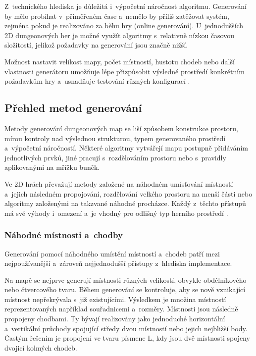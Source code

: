 \documentclass[
   program=itk,
   biblatex,
   figures=true,
   tables=true,
   glossaries,
   index
]{kidiplom}
\begin{document}
Z~technického hlediska je důležitá i~výpočetní náročnost algoritmu. Generování by mělo probíhat v~přiměřeném čase a~nemělo by příliš zatěžovat systém, zejména pokud je realizováno za běhu hry (online generování). U~jednodušších 2D dungeonových her je možné využít algoritmy s~relativně nízkou časovou složitostí, jelikož požadavky na generování jsou značně nižší.

Možnost nastavit velikost mapy, počet místností, hustotu chodeb nebo další vlastnosti generátoru umožňuje lépe přizpůsobit výsledné prostředí konkrétním požadavkům hry a~usnadňuje testování různých konfigurací \cite{Linden2014,Shaker2016}.

\subsection{Přehled metod generování}
\label{sec:prehledMetod}
Metody generování dungeonových map se liší způsobem konstrukce prostoru, mírou kontroly nad výslednou strukturou, typem generovaného prostředí a~výpočetní náročností. Některé algoritmy vytvářejí mapu postupně přidáváním jednotlivých prvků, jiné pracují s~rozdělováním prostoru nebo s~pravidly aplikovanými na mřížku buněk.

Ve 2D hrách převažují metody založené na náhodném umísťování místností a~jejich následném propojování, rozdělování velkého prostoru na menší části nebo algoritmy založenými na takzvané náhodné procházce. Každý z~těchto přístupů má své výhody i~omezení a~je vhodný pro odlišný typ herního prostředí \cite{Linden2014,Shaker2016}.

\subsubsection{Náhodné místnosti a~chodby}
Generování pomocí náhodného umístění místností a~chodeb patří mezi nejpoužívanější a~zároveň nejjednodušší přístupy z~hlediska implementace.

Na mapě se nejprve generují místnosti různých velikostí, obvykle obdélníkového nebo čtvercového tvaru. Během generování se kontroluje, aby se nově vznikající místnost nepřekrývala s~již existujícími. Výsledkem je množina místností reprezentovaných například souřadnicemi a~rozměry. Místnosti jsou následně propojeny chodbami. Ty bývají realizovány jako jednoduché horizontální a~vertikální průchody spojující středy dvou místností nebo jejich nejbližší body. Častým řešením je propojení ve tvaru písmene L, kdy jsou dvě místnosti spojeny dvojicí kolmých chodeb.
\end{document}
